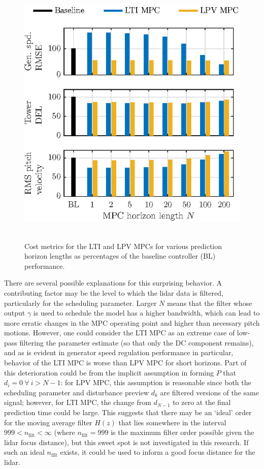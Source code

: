 \documentclass[letterpaper, 10 pt, conference]{ieeeconf}  %
\begin{document}
\begin{figure}[thbp]
	\centering
	\mbox{\includegraphics[trim=0 0 0 -5, clip, scale=1.0]{effectofN.eps}
	}
	\caption{Cost metrics for the LTI and LPV MPCs for various prediction horizon lengths as percentages of the baseline controller (BL) performance.}
	\label{fig:bargraph}
\end{figure}

There are several possible explanations for this surprising behavior. A contributing factor may be the level to which the lidar data is filtered, particularly for the scheduling parameter. Larger $N$ means that the filter whose output $\gamma$ is used to schedule the model has a higher bandwidth, which can lead to more erratic changes in the MPC operating point and higher than necessary pitch motions. However, one could consider the LTI MPC as an extreme case of low-pass filtering the parameter estimate (so that only the DC component remains), and as is evident in generator speed regulation performance in particular, behavior of the LTI MPC is worse than LPV MPC for short horizons. Part of this deterioration could be from the implicit assumption in forming $P$ that $d_{i} = 0\:\forall\:i>N-1$: for LPV MPC, this assumption is reasonable since both the scheduling parameter and disturbance preview $d_k$ are filtered versions of the same signal; however, for LTI MPC, the change from $d_{N-1}$ to zero at the final prediction time could be large. This suggests that there may be an `ideal' order for the moving average filter $H(z)$ that lies somewhere in the interval $999 < n_\mathrm{filt} < \infty$ (where $n_\mathrm{filt} = 999$ is the maximum filter order possible given the lidar focus distance), but this sweet spot is not investigated in this research. If such an ideal $n_\mathrm{filt}$ exists, it could be used to inform a good focus distance for the lidar.
\end{document}
